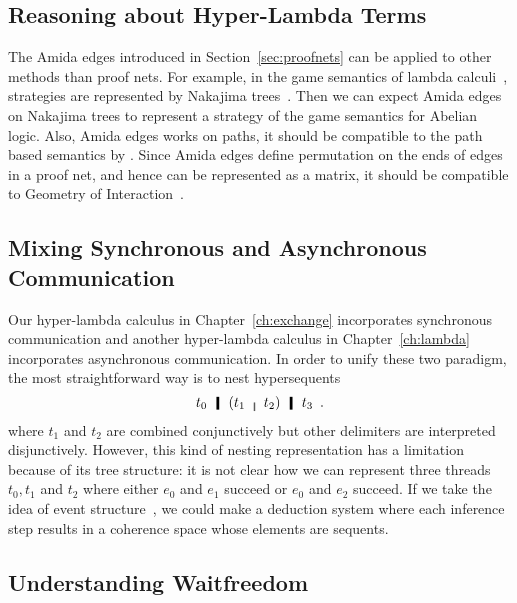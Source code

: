 
\subsection{Reasoning about Hyper-Lambda Terms}

The Amida edges introduced in Section~\ref{sec:proofnets} can be applied
to other methods than proof nets.
For example, in the game semantics of lambda calculi~\citep{untyped},
strategies are represented by Nakajima trees~\citep{nakajima1975}.
Then we can expect  Amida edges on Nakajima trees to represent a
strategy of the game semantics for Abelian logic.
Also, Amida edges works on paths, it should be compatible to the path
based semantics by \citet{danos-regnier}.
Since Amida edges define permutation on the ends of edges in a proof
net, and hence can be represented as a matrix, it should be compatible
to Geometry of Interaction~\citep{girard1989}.

\subsection{Mixing Synchronous and Asynchronous Communication}

Our hyper-lambda calculus in Chapter~\ref{ch:exchange} incorporates
synchronous communication and another hyper-lambda calculus in
Chapter~\ref{ch:lambda} incorporates asynchronous communication.
In order to unify these two paradigm, the most straightforward way is to
nest hypersequents
\[
 t_0\hmid (t_1 \whitemid t_2) \hmid t_3 \enspace.
\]
where $t_1$ and $t_2$ are combined conjunctively but other delimiters
are interpreted disjunctively.
However, this kind of nesting representation has a limitation because of
its tree structure: it is not clear how we can represent three threads
$t_0, t_1$ and $t_2$ where either $e_0$ and $e_1$ succeed or $e_0$ and
$e_2$ succeed.
If we take the idea of event structure~\citep{winskel1980},
we could make a deduction system where each inference step results in a
coherence space whose elements are sequents.

\subsection{Understanding Waitfreedom}

